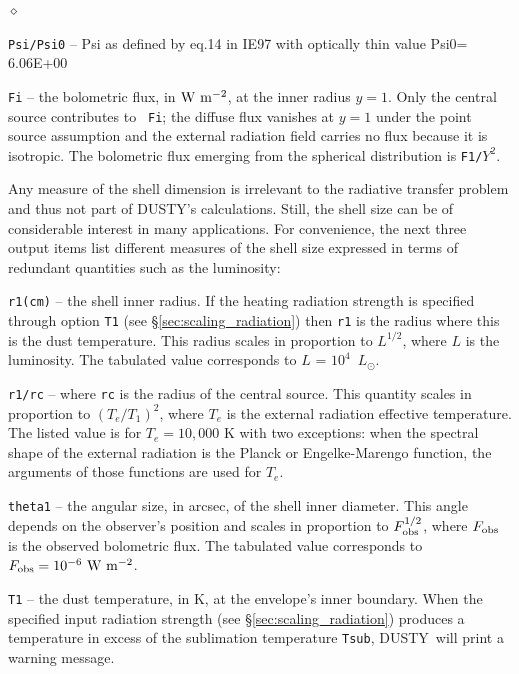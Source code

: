 \documentclass[11pt]{article}
\def\D    {{\sf DUSTY}}
\def\E#1{\hbox{$10^{#1}$}}
\def\Lo     {\hbox{$L_{\odot}$}}
\begin{document}
\begin{list}{$\diamond$}{}
\item {\tt Psi/Psi0} -- Psi as defined by eq.14 in IE97 with optically
  thin value Psi0= 6.06E+00
\item {\tt Fi} -- the bolometric flux, in $\rm W\ m^{-2}$, at the
  inner radius $y = 1$. Only the central source contributes to {\tt
    Fi}; the diffuse flux vanishes at $y = 1$ under the point source
  assumption and the external radiation field carries no flux because
  it is isotropic. The bolometric flux emerging from the spherical
  distribution is {\tt F1/$Y^2$}.

  Any measure of the shell dimension is irrelevant to the radiative
  transfer problem and thus not part of \D's calculations.  Still, the
  shell size can be of considerable interest in many applications. For
  convenience, the next three output items list different measures of
  the shell size expressed in terms of redundant quantities such as
  the luminosity:

\item {\tt r1(cm)} -- the shell inner radius. If the heating radiation
  strength is specified through option {\tt T1} (see
  \S\ref{sec:scaling_radiation}) then {\tt r1} is the radius where
  this is the dust temperature. This radius scales in proportion to
  $L^{1/2}$, where $L$ is the luminosity. The tabulated value
  corresponds to $L$ = \E4~\Lo.

\item {\tt r1/rc} -- where {\tt rc} is the radius of the central
  source.  This quantity scales in proportion to $(T_e/T_1)^2$, where
  $T_e$ is the external radiation effective temperature.  The listed
  value is for $T_e = 10,000$ K with two exceptions: when the spectral
  shape of the external radiation is the Planck or Engelke-Marengo
  function, the arguments of those functions are used for $T_e$.

\item {\tt theta1} -- the angular size, in arcsec, of the shell inner
  diameter.  This angle depends on the observer's position and scales
  in proportion to $F_{\rm obs}^{1/2}$, where $F_{\rm obs}$ is the
  observed bolometric flux.  The tabulated value corresponds to
  $F_{\rm obs} = \E{-6}\ \rm W\ m^{-2}$.

\item {\tt T1} -- the dust temperature, in K, at the envelope's inner
  boundary. When the specified input radiation strength (see
  \S\ref{sec:scaling_radiation}) produces a temperature in excess of
  the sublimation temperature {\tt Tsub}, \D\ will print a warning message.


\end{list}
\end{document}
